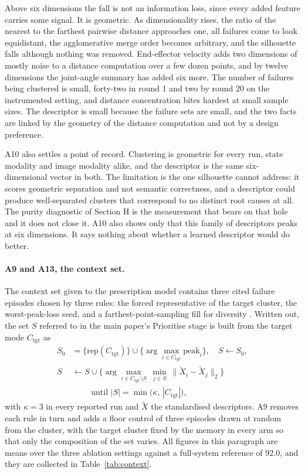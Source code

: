 \documentclass[letterpaper]{article}
\begin{document}
Above six dimensions the fall is not an information loss, since every added feature
carries some signal. It is geometric. As dimensionality rises, the ratio of the nearest
to the farthest pairwise distance approaches one, all failures come to look
equidistant, the agglomerative merge order becomes arbitrary, and the silhouette falls
although nothing was removed. End-effector velocity adds two dimensions of mostly noise
to a distance computation over a few dozen points, and by twelve dimensions the
joint-angle summary has added six more. The number of failures being clustered is
small, forty-two in round 1 and two by round 20 on the instrumented setting, and
distance concentration bites hardest at small sample sizes. The descriptor is small
because the failure sets are small, and the two facts are linked by the geometry of the
distance computation and not by a design preference.

A10 also settles a point of record. Clustering is geometric for every run, state
modality and image modality alike, and the descriptor is the same six-dimensional
vector in both. The limitation is the one silhouette cannot address: it scores
geometric separation and not semantic correctness, and a descriptor could produce
well-separated clusters that correspond to no distinct root causes at all. The purity
diagnostic of Section H is the measurement that bears on that hole and it does not close
it. A10 also shows only that this family of descriptors peaks at six dimensions. It says
nothing about whether a learned descriptor would do better.

\paragraph{A9 and A13, the context set.} The context set given to the prescription model
contains three cited failure episodes chosen by three rules: the forced representative
of the target cluster, the worst-peak-loss seed, and a farthest-point-sampling fill for
diversity \citep{eldar1997fps}. Written out, the set $S$ referred to in the main paper's
Prioritise stage is built from the target mode $C_{\mathrm{tgt}}$ as
%
\begin{equation}
\label{eq:context}
\begin{aligned}
S_0 &= \big\{\mathrm{rep}(C_{\mathrm{tgt}})\big\} \cup \Big\{\arg\max_{i \in
C_{\mathrm{tgt}}} \mathrm{peak}_i\Big\}, \quad S \leftarrow S_0, \\
S &\leftarrow S \cup \Big\{ \arg\max_{i \in C_{\mathrm{tgt}} \setminus S} \
\min_{j \in S} \ \big\| \tilde{X}_i - \tilde{X}_j \big\|_2 \Big\} \\
&\qquad \text{ until } |S| = \min\big(\kappa,\, |C_{\mathrm{tgt}}|\big),
\end{aligned}
\end{equation}
%
with $\kappa = 3$ in every reported run and $\tilde{X}$ the standardised descriptors.
A9 removes each rule in turn and adds a floor control of
three episodes drawn at random from the cluster, with the target cluster fixed by the
memory in every arm so that only the composition of the set varies. All figures in this
paragraph are means over the three ablation settings against a full-system reference of
92.0, and they are collected in Table~\ref{tab:context}.
\end{document}
